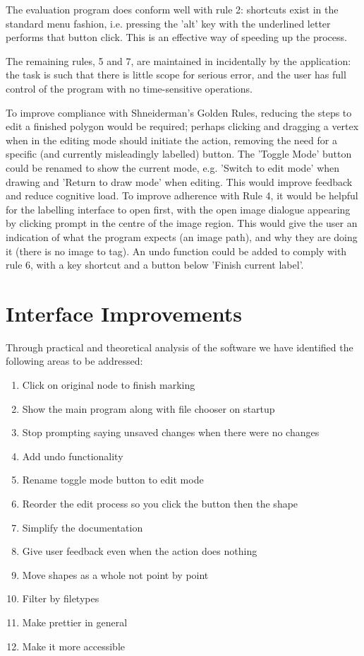 \documentclass[a4paper,11pt,oneside]{article}
\begin{document}
The evaluation program does conform well with rule 2: shortcuts exist in the standard menu fashion, i.e. pressing the 'alt' key with the underlined letter performs that button click. This is an effective way of speeding up the process.

The remaining rules, 5 and 7, are maintained in incidentally by the application: the task is such that there is little scope for serious error, and the user has full control of the program with no time-sensitive operations.

To improve compliance with Shneiderman's Golden Rules, reducing the steps to edit a finished polygon would be required; perhaps clicking and dragging a vertex when in the editing mode should initiate the action, removing the need for a specific (and currently misleadingly labelled) button. The 'Toggle Mode' button could be renamed to show the current mode, e.g. 'Switch to edit mode' when drawing and 'Return to draw mode' when editing. This would improve feedback and reduce cognitive load. To improve adherence with Rule 4, it would be helpful for the labelling interface to open first, with the open image dialogue appearing by clicking prompt in the centre of the image region. This would give the user an indication of what the program expects (an image path), and why they are doing it (there is no image to tag). An undo function could be added to comply with rule 6, with a key shortcut and a button below 'Finish current label'.

\section{Interface Improvements}
Through practical and theoretical analysis of the software we have identified the following areas to be addressed:
\begin{enumerate}
    \item{Click on original node to finish marking}
    \item{Show the main program along with file chooser on startup}
    \item{Stop prompting saying unsaved changes when there were no changes}
    \item{Add undo functionality}
    \item{Rename toggle mode button to edit mode}
    \item{Reorder the edit process so you click the button then the shape}
    \item{Simplify the documentation}
    \item{Give user feedback even when the action does nothing}
    \item{Move shapes as a whole not point by point}
    \item{Filter by filetypes}
    \item{Make prettier in general}
    \item{Make it more accessible}
\end{enumerate}
\end{document}
